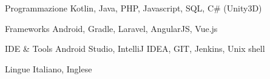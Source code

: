 


\begin{cvskills}


\cvskill
{Programmazione} %
{Kotlin, Java, PHP, Javascript, SQL, C\# (Unity3D)} %


\cvskill
{Frameworks} %
{Android, Gradle, Laravel, AngularJS, Vue.js} %


\cvskill
{IDE \& Tools} %
{Android Studio, IntelliJ IDEA, GIT, Jenkins, Unix shell} %


\cvskill
{Lingue} %
{Italiano, Inglese} %


\end{cvskills}
